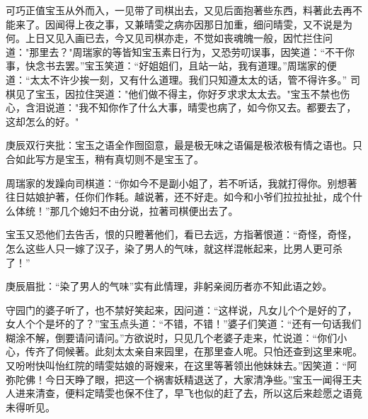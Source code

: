 \begin{parag}


    可巧正值宝玉从外而入，一见带了司棋出去，又见后面抱著些东西，料著此去再不能来了。因闻得上夜之事，又兼晴雯之病亦因那日加重，细问晴雯，又不说是为何。上日又见入画已去，今又见司棋亦走，不觉如丧魂魄一般，因忙拦住问道："那里去？"周瑞家的等皆知宝玉素日行为，又恐劳叨误事，因笑道：“不干你事，快念书去罢。”宝玉笑道：“好姐姐们，且站一站，我有道理。”周瑞家的便道：“太太不许少挨一刻，又有什么道理。我们只知遵太太的话，管不得许多。” 司棋见了宝玉，因拉住哭道："他们做不得主，你好歹求求太太去。"宝玉不禁也伤心，含泪说道："我不知你作了什么大事，晴雯也病了，如今你又去。都要去了，这却怎么的好。"\begin{note}庚辰双行夹批：宝玉之语全作囫囵意，最是极无味之语偏是极浓极有情之语也。只合如此写方是宝玉，稍有真切则不是宝玉了。\end{note}周瑞家的发躁向司棋道：“你如今不是副小姐了，若不听话，我就打得你。别想著往日姑娘护著，任你们作耗。越说著，还不好走。如今和小爷们拉拉扯扯，成个什么体统！”那几个媳妇不由分说，拉著司棋便出去了。
\end{parag}


\begin{parag}


    宝玉又恐他们去告舌，恨的只瞪著他们，看已去远，方指著恨道：“奇怪，奇怪，怎么这些人只一嫁了汉子，染了男人的气味，就这样混帐起来，比男人更可杀了！”\begin{note}庚辰眉批：“染了男人的气味”实有此情理，非躬亲阅历者亦不知此语之妙。\end{note}守园门的婆子听了，也不禁好笑起来，因问道：“这样说，凡女儿个个是好的了，女人个个是坏的了？”宝玉点头道：“不错，不错！”婆子们笑道：“还有一句话我们糊涂不解，倒要请问请问。”方欲说时，只见几个老婆子走来，忙说道：“你们小心，传齐了伺候著。此刻太太亲自来园里，在那里查人呢。只怕还查到这里来呢。又吩咐快叫怡红院的晴雯姑娘的哥嫂来，在这里等著领出他妹妹去。”因笑道：“阿弥陀佛！今日天睁了眼，把这一个祸害妖精退送了，大家清净些。”宝玉一闻得王夫人进来清查，便料定晴雯也保不住了，早飞也似的赶了去，所以这后来趁愿之语竟未得听见。
\end{parag}



